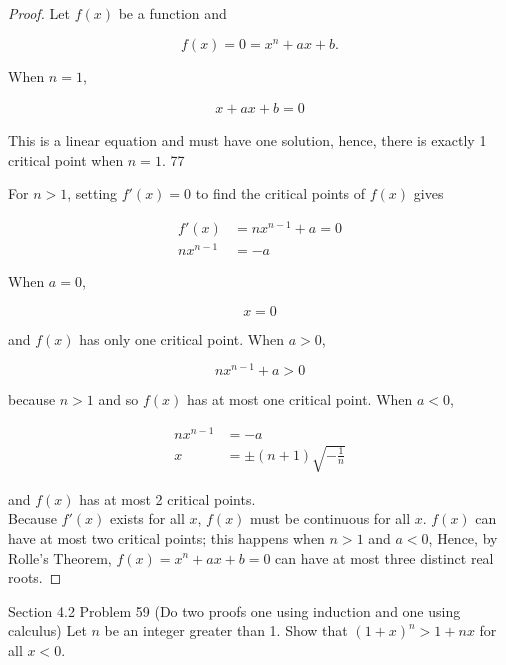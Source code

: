 \documentclass{article}
\begin{document}
    \begin{proof}
        Let $f(x)$ be a function and

        \[
            f(x) = 0 = x^n + ax + b.
        \]

        When $n=1$,

        \begin{align*}
            x+ax+b=0
        \end{align*}

        This is a linear equation and must have one solution, hence, there is exactly 1 critical point when $n=1$. 77

        For $n>1$, setting $f'(x)=0$ to find the critical points of $f(x)$ gives

        \begin{align*}
            f'(x)   &= nx^{n-1} + a = 0 \\
            nx^{n-1} &= -a
        \end{align*}

        When $a = 0$,

        \[
            x=0
        \]

        and $f(x)$ has only one critical point. When $a>0$,

        \[
            nx^{n-1} + a > 0
        \]

        because $n>1$ and so $f(x)$ has at most one critical point. When $a<0$,

        \begin{align*}
            nx^{n-1}    &= -a \\
            x           &= \pm (n+1)\sqrt{-\frac{1}{n}}
        \end{align*}

        and $f(x)$ has at most 2 critical points. \\

        Because $f'(x)$ exists for all $x$, $f(x)$ must be continuous for all $x$. $f(x)$ can have at most two critical points; this happens when $n>1$ and $a<0$, Hence, by Rolle's Theorem, $f(x)=x^n+ax+b=0$ can have at
        most three distinct real roots.
    \end{proof}


    \begin{tbhtheorem}{Section 4.2 Problem 59 (Do two proofs one using induction and one using calculus)}
        Let $n$ be an integer greater than 1. Show that $(1+x)^n>1+nx$ for all $x<0$.
    \end{tbhtheorem}
\end{document}
